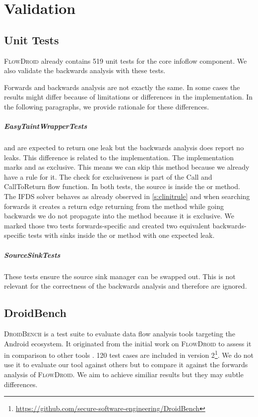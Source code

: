\documentclass[../draft.tex]{subfiles}
\begin{document}
    \chapter{Validation}
    \section{Unit Tests}
    \textsc{FlowDroid} already contains 519 unit tests for the core infoflow component. We also validate the backwards analysis with these tests.

    Forwards and backwards analysis are not exactly the same. In some cases the results might differ because of limitations or differences in the implementation. In the following paragraphs, we provide rationale for these differences.

    \paragraph{EasyTaintWrapperTests}  and  are expected to return one leak but the backwards analysis does report no leaks. This difference is related to the  implementation. The implementation marks  and  as exclusive. This means we can skip this method because we already have a rule for it. The check for exclusiveness is part of the Call and CallToReturn flow function. In both tests, the source is inside the  or  method. The IFDS solver behaves as already observed in \autoref{s:clinitrule} and when searching forwards it creates a return edge returning from the method while going backwards we do not propagate into the method because it is exclusive.
    We marked those two tests forwards-specific and created two equivalent backwards-specific tests with sinks inside the  or  method with one expected leak.
    
    \paragraph{SourceSinkTests} These tests ensure the source sink manager can be swapped out. This is not relevant for the correctness of the backwards analysis and therefore are ignored.

    

    \section{DroidBench}
    \textsc{DroidBench} is a test suite to evaluate data flow analysis tools targeting the Android ecosystem. It originated from the initial work on \textsc{FlowDroid} to assess it in comparison to other tools \cite{Arzt2014}. 120 test cases are included in version 2\footnote{\url{https://github.com/secure-software-engineering/DroidBench}}.
    We do not use it to evaluate our tool against others but to compare it against the forwards analysis of \textsc{FlowDroid}. We aim to achieve similiar results but they may subtle differences.
    
\end{document}
